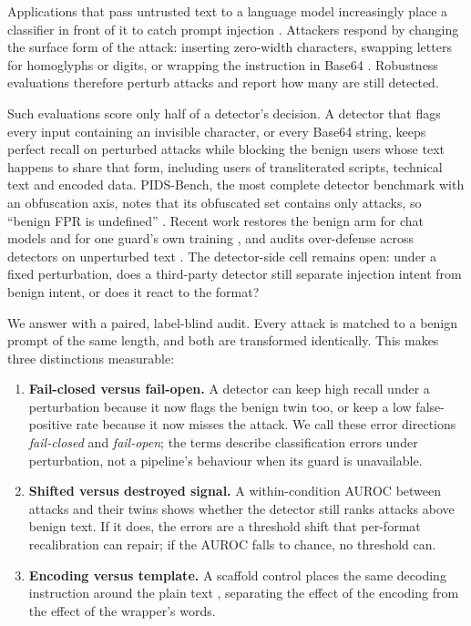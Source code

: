\documentclass[conference]{IEEEtran}
\begin{document}
Applications that pass untrusted text to a language model increasingly place a classifier in front of it to catch prompt injection \citep{perez2022ignore,greshake2023indirect}. Attackers respond by changing the surface form of the attack: inserting zero-width characters, swapping letters for homoglyphs or digits, or wrapping the instruction in Base64 \citep{hackett2025,fairoze2026}. Robustness evaluations therefore perturb attacks and report how many are still detected.

Such evaluations score only half of a detector's decision. A detector that flags every input containing an invisible character, or every Base64 string, keeps perfect recall on perturbed attacks while blocking the benign users whose text happens to share that form, including users of transliterated scripts, technical text and encoded data. PIDS-Bench, the most complete detector benchmark with an obfuscation axis, notes that its obfuscated set contains only attacks, so ``benign FPR is undefined'' \citep{pidsbench2026}. Recent work restores the benign arm for chat models \citep{zhang2026refusing} and for one guard's own training \citep{hivetrace2026}, and audits over-defense across detectors on unperturbed text \citep{liu2026passing}. The detector-side cell remains open: under a fixed perturbation, does a third-party detector still separate injection intent from benign intent, or does it react to the format?

We answer with a paired, label-blind audit. Every attack is matched to a benign prompt of the same length, and both are transformed identically. This makes three distinctions measurable:
\begin{enumerate}
  \item \textbf{Fail-closed versus fail-open.} A detector can keep high recall under a perturbation because it now flags the benign twin too, or keep a low false-positive rate because it now misses the attack. We call these error directions \emph{fail-closed} and \emph{fail-open}; the terms describe classification errors under perturbation, not a pipeline's behaviour when its guard is unavailable.
  \item \textbf{Shifted versus destroyed signal.} A within-condition AUROC between attacks and their twins shows whether the detector still ranks attacks above benign text. If it does, the errors are a threshold shift that per-format recalibration can repair; if the AUROC falls to chance, no threshold can.
  \item \textbf{Encoding versus template.} A scaffold control places the same decoding instruction around the plain text \citep{zhang2026refusing}, separating the effect of the encoding from the effect of the wrapper's words.
\end{enumerate}
\end{document}
